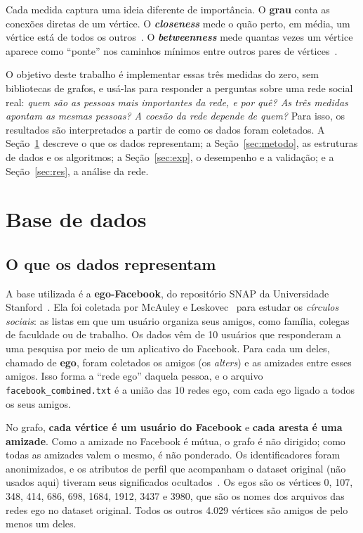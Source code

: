 \documentclass[conference]{IEEEtran}
\begin{document}
Cada medida captura uma ideia diferente de importância. O \textbf{grau} conta as conexões diretas de um vértice. O \textbf{\textit{closeness}} mede o quão perto, em média, um vértice está de todos os outros~\cite{sabidussi1966}. O \textbf{\textit{betweenness}} mede quantas vezes um vértice aparece como ``ponte'' nos caminhos mínimos entre outros pares de vértices~\cite{freeman1977}.

O objetivo deste trabalho é implementar essas três medidas do zero, sem bibliotecas de grafos, e usá-las para responder a perguntas sobre uma rede social real: \emph{quem são as pessoas mais importantes da rede, e por quê? As três medidas apontam as mesmas pessoas? A coesão da rede depende de quem?} Para isso, os resultados são interpretados a partir de como os dados foram coletados. A Seção~\ref{sec:base} descreve o que os dados representam; a Seção~\ref{sec:metodo}, as estruturas de dados e os algoritmos; a Seção~\ref{sec:exp}, o desempenho e a validação; e a Seção~\ref{sec:res}, a análise da rede.

\section{Base de dados}\label{sec:base}

\subsection{O que os dados representam}

A base utilizada é a \textbf{ego-Facebook}, do repositório SNAP da Universidade Stanford~\cite{snap2014}. Ela foi coletada por McAuley e Leskovec~\cite{mcauley2012} para estudar os \emph{círculos sociais}: as listas em que um usuário organiza seus amigos, como família, colegas de faculdade ou de trabalho. Os dados vêm de 10 usuários que responderam a uma pesquisa por meio de um aplicativo do Facebook. Para cada um deles, chamado de \textbf{ego}, foram coletados os amigos (os \emph{alters}) e as amizades entre esses amigos. Isso forma a ``rede ego'' daquela pessoa, e o arquivo \texttt{facebook\_combined.txt} é a união das 10 redes ego, com cada ego ligado a todos os seus amigos.

No grafo, \textbf{cada vértice é um usuário do Facebook} e \textbf{cada aresta é uma amizade}. Como a amizade no Facebook é mútua, o grafo é não dirigido; como todas as amizades valem o mesmo, é não ponderado. Os identificadores foram anonimizados, e os atributos de perfil que acompanham o dataset original (não usados aqui) tiveram seus significados ocultados~\cite{snap2014}. Os egos são os vértices 0, 107, 348, 414, 686, 698, 1684, 1912, 3437 e 3980, que são os nomes dos arquivos das redes ego no dataset original. Todos os outros 4.029 vértices são amigos de pelo menos um deles.
\end{document}
